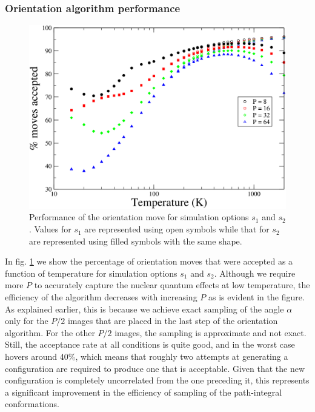             \subsubsection{Orientation algorithm performance}
                \label{sec:orPerformance}
                \begin{figure}[!htbp]
                    \centering
                    \includegraphics[scale=0.20,keepaspectratio]{Chapter-4/Figures/s12orAcc.png}
                    \caption{Performance of the orientation move for simulation options $s_1$ and $s_2$. Values for $s_1$ are represented using open symbols while that for $s_2$ are represented using filled symbols with the same shape.}
                    \label{fig:r0Acc}
                \end{figure}

                In fig. \ref{fig:r0Acc} we show the percentage of orientation moves that were accepted as a function of temperature for simulation options $s_1$ and $s_2$. Although we require more $P$ to accurately capture the nuclear quantum effects at low temperature, the efficiency of the algorithm decreases with increasing $P$ as is evident in the figure. As explained earlier, this is because we achieve exact sampling of the angle $\alpha$ only for the $P/2$ images that are placed in the last step of the orientation algorithm. For the other $P/2$ images, the sampling is approximate and not exact. Still, the acceptance rate at all conditions is quite good, and in the worst case hovers around 40\%, which means that roughly two attempts at generating a configuration are required to produce one that is acceptable. Given that the new configuration is completely uncorrelated from the one preceding it, this represents a significant improvement in the efficiency of sampling of the path-integral conformations.

